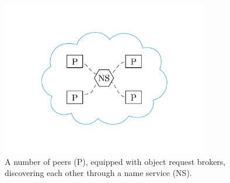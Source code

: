 \begin{figure}
  \centering
  \includegraphics[width=0.8\textwidth, clip=true, trim=0 180px 0 180px]{include/assets/name-service.pdf}
  \caption{A number of peers (P), equipped with object request brokers, discovering each other through a name service (NS).}
\end{figure}
